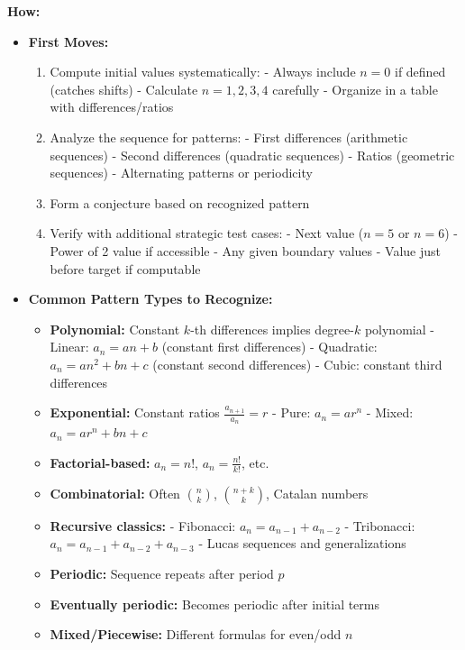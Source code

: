 \documentclass[12pt]{article}
\begin{document}
\textbf{How:}
\begin{itemize}
    \item \textbf{First Moves:} 
    \begin{enumerate}
        \item Compute initial values systematically:
            - Always include $n=0$ if defined (catches shifts)
            - Calculate $n=1,2,3,4$ carefully
            - Organize in a table with differences/ratios
        \item Analyze the sequence for patterns:
            - First differences (arithmetic sequences)
            - Second differences (quadratic sequences)
            - Ratios (geometric sequences)
            - Alternating patterns or periodicity
        \item Form a conjecture based on recognized pattern
        \item Verify with additional strategic test cases:
            - Next value ($n=5$ or $n=6$)
            - Power of 2 value if accessible
            - Any given boundary values
            - Value just before target if computable
    \end{enumerate}
    
    \item \textbf{Common Pattern Types to Recognize:}
    \begin{itemize}
        \item \textbf{Polynomial:} Constant $k$-th differences implies degree-$k$ polynomial
            - Linear: $a_n = an + b$ (constant first differences)
            - Quadratic: $a_n = an^2 + bn + c$ (constant second differences)
            - Cubic: constant third differences
        \item \textbf{Exponential:} Constant ratios $\frac{a_{n+1}}{a_n} = r$
            - Pure: $a_n = ar^n$
            - Mixed: $a_n = ar^n + bn + c$
        \item \textbf{Factorial-based:} $a_n = n!$, $a_n = \frac{n!}{k!}$, etc.
        \item \textbf{Combinatorial:} Often $\binom{n}{k}$, $\binom{n+k}{k}$, Catalan numbers
        \item \textbf{Recursive classics:}
            - Fibonacci: $a_n = a_{n-1} + a_{n-2}$
            - Tribonacci: $a_n = a_{n-1} + a_{n-2} + a_{n-3}$
            - Lucas sequences and generalizations
        \item \textbf{Periodic:} Sequence repeats after period $p$
        \item \textbf{Eventually periodic:} Becomes periodic after initial terms
        \item \textbf{Mixed/Piecewise:} Different formulas for even/odd $n$
    \end{itemize}
    

\end{itemize}
\end{document}
